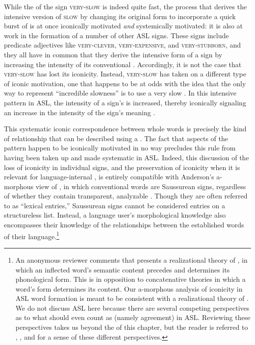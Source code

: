\documentclass[output=paper,
modfonts
]{LSP/langsci}
\begin{document}
  While the  of the sign \textsc{very-slow} is indeed quite fast, the process that derives the intensive version of \textsc{slow} by changing its original form to incorporate a quick burst of  is at once iconically motivated \textit{and} systemically motivated: it is also at work in the formation of a number of other ASL signs. These signs include predicate adjectives like \textsc{very-clever, very-expensive,} and \textsc{very-stubborn}, and they all have in common that they derive the intensive form of a sign by increasing the intensity of its conventional . Accordingly, it is not the case that \textsc{very-slow} has lost its iconicity. Instead, \textsc{very-slow} has taken on a different type of iconic motivation, one that happens to be at odds with the idea that the only way to represent ``incredible slowness'' is to use a very slow  \citep[229]{Taub2001}. In this intensive  pattern in ASL, the intensity of a sign's  is increased, thereby iconically signaling an increase in the intensity of the sign's meaning \citep[153]{Wilcox1995}.

  This systematic iconic correspondence between whole words is precisely the kind of relationship that can be described using a . The fact that aspects of the pattern happen to be iconically motivated in no way precludes this rule from having been taken up and made systematic in ASL. Indeed, this discussion of the loss of iconicity in individual signs, and the preservation of iconicity when it is relevant for language-internal , is entirely compatible with Anderson's a-morphous view of , in which conventional words are Saussurean signs, regardless of whether they contain transparent, analyzable . Though they are often referred to as ``lexical entries,'' Saussurean signs cannot be considered entries on a structureless list. Instead, a language user's morphological knowledge also encompasses their knowledge of the relationships between the established words of their language.\footnote{An anonymous reviewer comments that \citet{anderson1992} presents a realizational theory of , in which an inflected word's semantic content precedes and determines its phonological form. This is in opposition to concatenative theories in which a word's form determines its content. Our a-morphous analysis of iconicity in ASL word formation is meant to be consistent with a realizational theory of . We do not discuss ASL   here because there are several competing perspectives as to what should even count as   (namely agreement) in ASL. Reviewing these perspectives takes us beyond the  of this chapter, but the reader is referred to \citet{LilloMartin2011}, \citet{Wilbur2013}, and \citet{Wilcox2016} for a sense of these different perspectives.}
\end{document}
